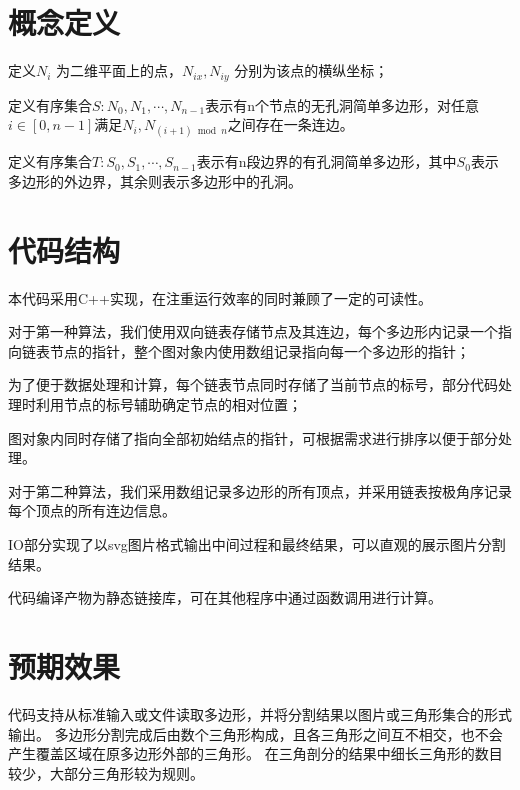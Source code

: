 \section{概念定义}

定义\(N_i\) 为二维平面上的点，\(N_{ix},N_{iy}\) 分别为该点的横纵坐标；

定义有序集合\(S:N_0,N_1,\cdots,N_{n-1}\)表示有n个节点的无孔洞简单多边形，对任意\(i\in [0,n-1] \)满足\(N_i,N_{(i+1) \bmod n}\)之间存在一条连边。

定义有序集合\(T:S_0,S_1,\cdots,S_{n-1}\)表示有n段边界的有孔洞简单多边形，其中\(S_0\)表示多边形的外边界，其余则表示多边形中的孔洞。

\section{代码结构}

本代码采用C++实现，在注重运行效率的同时兼顾了一定的可读性。

对于第一种算法，我们使用双向链表存储节点及其连边，每个多边形内记录一个指向链表节点的指针，整个图对象内使用数组记录指向每一个多边形的指针；

为了便于数据处理和计算，每个链表节点同时存储了当前节点的标号，部分代码处理时利用节点的标号辅助确定节点的相对位置；

图对象内同时存储了指向全部初始结点的指针，可根据需求进行排序以便于部分处理。

对于第二种算法，我们采用数组记录多边形的所有顶点，并采用链表按极角序记录每个顶点的所有连边信息。

IO部分实现了以svg图片格式输出中间过程和最终结果，可以直观的展示图片分割结果。

代码编译产物为静态链接库，可在其他程序中通过函数调用进行计算。

\section{预期效果}
代码支持从标准输入或文件读取多边形，并将分割结果以图片或三角形集合的形式输出。
多边形分割完成后由数个三角形构成，且各三角形之间互不相交，也不会产生覆盖区域在原多边形外部的三角形。
在三角剖分的结果中细长三角形的数目较少，大部分三角形较为规则。



